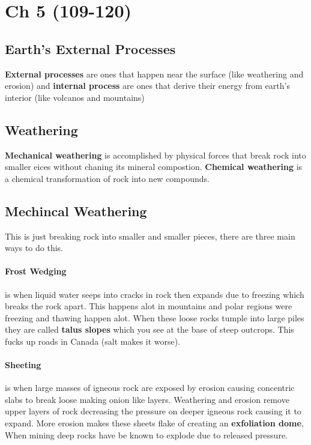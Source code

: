 \documentclass{article}
\begin{document}


\section{Ch 5 (109-120)} %
\label{sec:ch_5_}
\subsection{Earth's External Processes} %
\label{sub:earth_s_external_processes}
\textbf{External processes} are ones that happen near the surface (like weathering and erosion) and \textbf{internal process} are ones that derive their energy from earth's interior (like volcanos and mountains)

\subsection{Weathering} %
\label{sub:weathering}
\textbf{Mechanical weathering} is accomplished by physical forces that break rock into smaller eices without chaning its mineral compostion. \textbf{Chemical weathering} is a chemical transformation of rock into new compounds.

\subsection{Mechincal Weathering} %
\label{sub:mechincal_weathering}
This is just breaking rock into smaller and smaller pieces, there are three main ways to do this.

\paragraph{Frost Wedging} %
\label{par:frost_wedging}
is when liquid water seeps into cracks in rock then expands due to freezing which breaks the rock apart. This happens alot in mountains and polar regions were freezing and thawing happen alot. When these loose rocks tumple into large piles they are called \textbf{talus slopes} which you see at the base of steep outcrops. This fucks up roads in Canada (salt makes it worse).

\paragraph{Sheeting} %
\label{par:sheeting}
is when large masses of igneous rock are exposed by erosion causing concentric slabs to break loose making onion like layers. Weathering and erosion remove upper layers of rock decreasing the pressure on deeper igneous rock causing it to expand. More erosion makes these sheets flake of creating an \textbf{exfoliation dome}, When mining deep rocks have be known to explode due to released pressure.
\end{document}
